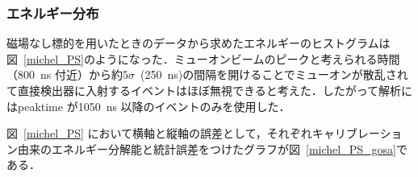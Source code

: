\subsubsection{エネルギー分布}
磁場なし標的を用いたときのデータから求めたエネルギーのヒストグラムは図~\ref{michel_PS}のようになった．ミューオンビームのピークと考えられる時間（800~ns 付近）から約$5\sigma$~(250~ns)の間隔を開けることでミューオンが散乱されて直接検出器に入射するイベントはほぼ無視できると考えた．したがって解析にはpeaktime が1050~ns 以降のイベントのみを使用した．
  
図~\ref{michel_PS} において横軸と縦軸の誤差として，それぞれキャリブレーション由来のエネルギー分解能と統計誤差をつけたグラフが図~\ref{michel_PS_gosa}である．
